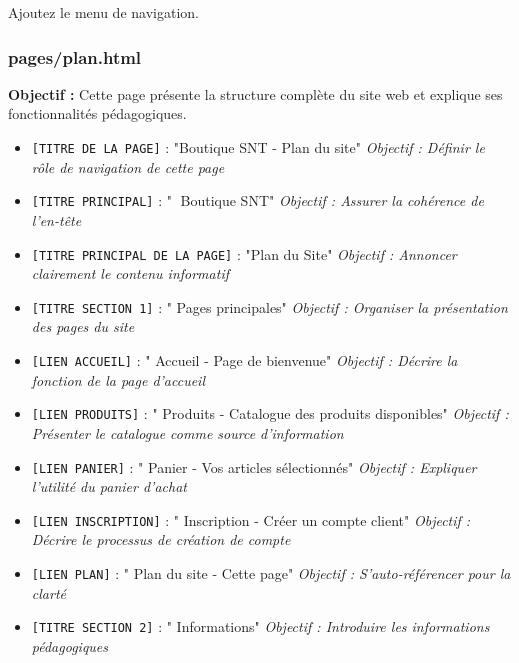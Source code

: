 \documentclass[12pt,a4paper]{article}
\begin{document}
Ajoutez le menu de navigation.

\subsubsection{pages/plan.html}

\textbf{Objectif :} Cette page présente la structure complète du site web et explique ses fonctionnalités pédagogiques.

\begin{itemize}
\item \texttt{[TITRE DE LA PAGE]} : "Boutique SNT - Plan du site" \newline \textit{Objectif : Définir le rôle de navigation de cette page}
\item \texttt{[TITRE PRINCIPAL]} : "🛒 Boutique SNT" \newline \textit{Objectif : Assurer la cohérence de l'en-tête}
\item \texttt{[TITRE PRINCIPAL DE LA PAGE]} : "Plan du Site" \newline \textit{Objectif : Annoncer clairement le contenu informatif}
\item \texttt{[TITRE SECTION 1]} : "\faMobile{} Pages principales" \newline \textit{Objectif : Organiser la présentation des pages du site}
\item \texttt{[LIEN ACCUEIL]} : "\faHome{} Accueil - Page de bienvenue" \newline \textit{Objectif : Décrire la fonction de la page d'accueil}
\item \texttt{[LIEN PRODUITS]} : "\faArchive{} Produits - Catalogue des produits disponibles" \newline \textit{Objectif : Présenter le catalogue comme source d'information}
\item \texttt{[LIEN PANIER]} : "\faShoppingCart{} Panier - Vos articles sélectionnés" \newline \textit{Objectif : Expliquer l'utilité du panier d'achat}
\item \texttt{[LIEN INSCRIPTION]} : "\faPencil{} Inscription - Créer un compte client" \newline \textit{Objectif : Décrire le processus de création de compte}
\item \texttt{[LIEN PLAN]} : "\faMap{} Plan du site - Cette page" \newline \textit{Objectif : S'auto-référencer pour la clarté}
\item \texttt{[TITRE SECTION 2]} : "\faInfo{} Informations" \newline \textit{Objectif : Introduire les informations pédagogiques}

\end{itemize}
\end{document}

